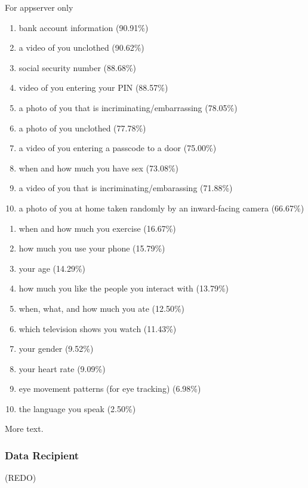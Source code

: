 \documentclass{acm_proc_article-sp}
\begin{document}
For appserver only  \\[-.8cm]

\begin{enumerate} \itemsep1pt \parskip0pt 
  \item bank account information (90.91\%)
  \item a video of you unclothed (90.62\%)
  \item social security number (88.68\%)
  \item video of you entering your PIN (88.57\%)
  \item a photo of you that is incriminating/embarrassing (78.05\%)
  \item a photo of you unclothed (77.78\%)
  \item a video of you entering a passcode to a door (75.00\%)
  \item when and how much you have sex (73.08\%)
  \item a video of you that is incriminating/embarassing (71.88\%)
  \item a photo of you at home taken randomly by an inward-facing camera (66.67\%)  \\[-.8cm]
\end{enumerate}

\begin{enumerate} \itemsep1pt \parskip0pt 
  \setcounter{enumi}{63}
  \item when and how much you exercise (16.67\%)
  \item how much you use your phone (15.79\%)
  \item your age (14.29\%)
  \item how much you like the people you interact with (13.79\%)
  \item when, what, and how much you ate (12.50\%)
  \item which television shows you watch (11.43\%)
  \item your gender (9.52\%)
  \item your heart rate (9.09\%)
  \item eye movement patterns (for eye tracking) (6.98\%)
  \item the language you speak (2.50\%)\\[-.8cm]
\end{enumerate}

More text.

\subsubsection{Data Recipient}
(REDO) 
\end{document}
